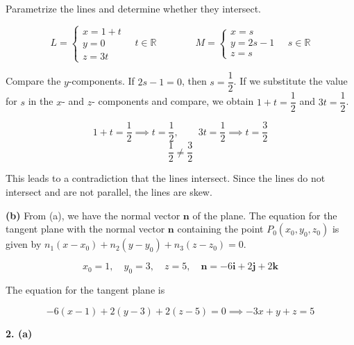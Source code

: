 \documentclass{article}
\begin{document}
Parametrize the lines and determine whether they intersect.

\[L=\left\{\begin{array}{l}
x=1+t\\
y=0\\
z=3t
\end{array}\right.\quad t\in\mathbb{R}\qquad\qquad M=\left\{\begin{array}{l}
x=s\\
y=2s-1\\
z=s
\end{array}\right.\quad s\in\mathbb{R}\]

Compare the $y$-components. If $2s-1=0$, then $s=\dfrac12$. If we substitute the value for $s$ in the $x$- and $z$- components and compare, we obtain $1+t=\dfrac12$ and $3t=\dfrac12$.

\[1+t=\frac12\implies t=\frac12,\qquad 3t=\frac12\implies t=\frac32\]
\[\frac12\neq\frac32\]

This leads to a contradiction that the lines intersect. Since the lines do not intersect and are not parallel, the lines are skew.

\textbf{(b)} From (a), we have the normal vector $\mathbf n$ of the plane. The equation for the tangent plane with the normal vector $\mathbf n$ containing the point $P_0(x_0,y_0,z_0)$ is given by $n_1(x-x_0)+n_2(y-y_0)+n_3(z-z_0)=0$.

\[x_0=1,\quad y_0=3,\quad z=5,\quad \mathbf n=-6\mathbf{i}+2\mathbf{j}+2\mathbf{k}\]

The equation for the tangent plane is

\[-6(x-1)+2(y-3)+2(z-5)=0\implies\boxed{-3x+y+z=5}\]

\newpage

\textbf{2. (a)}
\begin{center}
\end{center}
\end{document}
